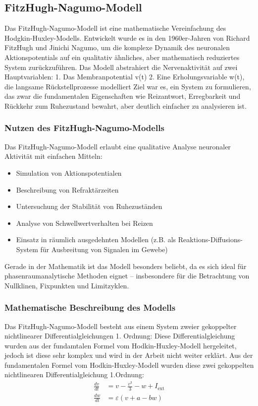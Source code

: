 \begin{refsection}
\section{FitzHugh-Nagumo-Modell}
Das FitzHugh-Nagumo-Modell ist eine mathematische Vereinfachung des Hodgkin-Huxley-Modells. Entwickelt wurde es in den 1960er-Jahren von Richard FitzHugh und Jinichi Nagumo, um die komplexe Dynamik des neuronalen Aktionspotentials auf ein qualitativ ähnliches, aber mathematisch reduziertes System zurückzuführen.
Das Modell abstrahiert die Nervenaktivität auf zwei Hauptvariablen:
1.	Das Membranpotential v(t)
2.	Eine Erholungsvariable w(t), die langsame Rückstellprozesse modelliert
Ziel war es, ein System zu formulieren, das zwar die fundamentalen Eigenschaften wie Reizantwort, Erregbarkeit und Rückkehr zum Ruhezustand bewahrt, aber deutlich einfacher zu analysieren ist. 
\subsubsection{Nutzen des FitzHugh-Nagumo-Modells}
Das FitzHugh-Nagumo-Modell erlaubt eine qualitative Analyse neuronaler Aktivität mit einfachen Mitteln:
\begin{itemize}
    \item Simulation von Aktionspotentialen
    \item Beschreibung von Refraktärzeiten
    \item Untersuchung der Stabilität von Ruhezuständen
    \item Analyse von Schwellwertverhalten bei Reizen
    \item Einsatz in räumlich ausgedehnten Modellen (z.B. als Reaktions-Diffusions-System für Ausbreitung von Signalen im Gewebe)
\end{itemize}
\noindent
Gerade in der Mathematik ist das Modell besonders beliebt, da es sich ideal für phasenraumanalytische Methoden eignet – insbesondere für die Betrachtung von Nullklinen, Fixpunkten und Limitzyklen.
\subsubsection{Mathematische Beschreibung des Modells}
Das FitzHugh-Nagumo-Modell besteht aus einem System zweier gekoppelter nichtlinearer Differentialgleichungen 1. Ordnung:
Diese Differentialgleichung wurden aus der fundamtalen Formel vom Hodkin-Huxley-Modell hergeleitet, jedoch ist diese sehr komplex und wird in der Arbeit nicht weiter erklärt. Aus der fundamentalen Formel vom Hodkin-Huxley-Modell wurden diese zwei gekoppelten nichtlinearen Differentialgleichung 1.Ordnung:
\[
\begin{aligned}
	\frac{dv}{dt} &= v - \frac{v^3}{3} - w + I_{\text{ext}} \\
	\frac{dw}{dt} &= \varepsilon (v + a - b w)
\end{aligned}
\]


\end{refsection}
